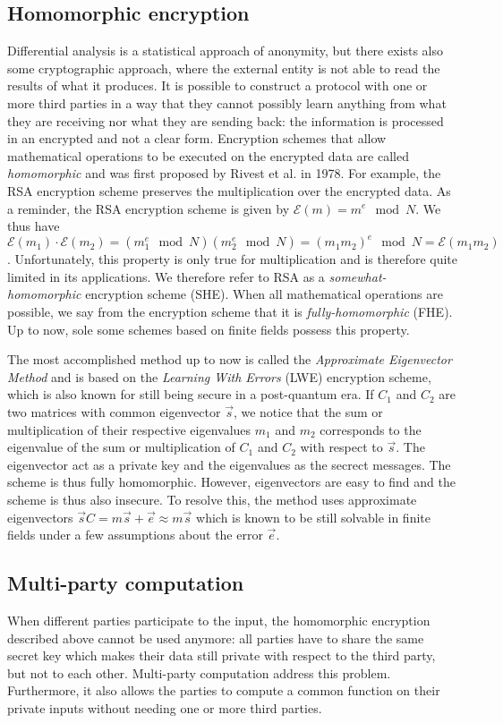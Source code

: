 \subsection{Homomorphic encryption}
Differential analysis is a statistical approach of anonymity, but there exists also some cryptographic approach, where the external entity is not able to read the results of what it produces. It is possible to construct a protocol with one or more third parties in a way that they cannot possibly learn anything from what they are receiving nor what they are sending back: the information is processed in an encrypted and not a clear form. Encryption schemes that allow mathematical operations to be executed on the encrypted data are called \emph{homomorphic} and was first proposed by Rivest et al. in 1978. For example, the RSA encryption scheme preserves the multiplication over the encrypted data. As a reminder, the RSA encryption scheme is given by $\mathscr{E}(m)=m^e \mod N$. We thus have $\mathscr{E}(m_1) \cdot  \mathscr{E}(m_2) = \left(m_1^e \mod N \right)\left(m_2^e \mod N \right) = \left(m_1m_2\right)^e \mod N = \mathscr{E}(m_1m_2)$. Unfortunately, this property is only true for multiplication and is therefore quite limited in its applications. We therefore refer to RSA as a \emph{somewhat-homomorphic} encryption scheme (SHE). When all mathematical operations are possible, we say from the encryption scheme that it is \emph{fully-homomorphic} (FHE). Up to now, sole some schemes based on finite fields possess this property. 

The most accomplished method up to now is called the \emph{Approximate Eigenvector Method} and is based on the \emph{Learning With Errors} (LWE) encryption scheme, which is also known for still being secure in a post-quantum era. If $C_1$ and $C_2$ are two matrices with common eigenvector $\vec{s}$, we notice that the sum or multiplication of their respective eigenvalues $m_1$ and $m_2$ corresponds to the eigenvalue of the sum or multiplication of $C_1$ and $C_2$ with respect to $\vec{s}$. The eigenvector act as a private key and the eigenvalues as the secrect messages. The scheme is thus fully homomorphic. However, eigenvectors are easy to find and the scheme is thus also insecure. To resolve this, the method uses approximate eigenvectors $\vec{s}C=m\vec{s}+\vec{e}\approx m\vec{s}$ which is known to be still solvable in finite fields under a few assumptions about the error $\vec{e}$.

\subsection{Multi-party computation}
When different parties participate to the input, the homomorphic encryption described above cannot be used anymore: all parties have to share the same secret key which makes their data still private with respect to the third party, but not to each other. Multi-party computation address this problem. Furthermore, it also allows the parties to compute a common function on their private inputs without needing one or more third parties. 

